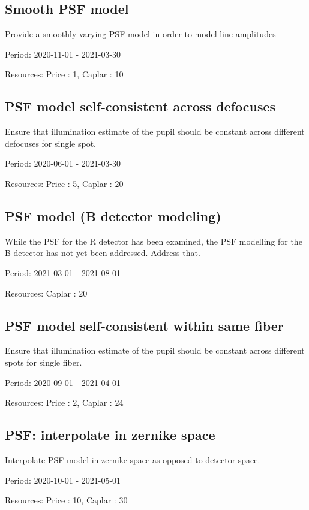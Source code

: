 \subsection{Smooth PSF model}

Provide a smoothly varying PSF model in order to model line amplitudes

Period: 2020-11-01 - 2021-03-30

Resources: Price : 1, Caplar : 10

\subsection{PSF model self-consistent across defocuses}

Ensure that illumination estimate of the pupil should be constant across different defocuses for single spot.

Period: 2020-06-01 - 2021-03-30

Resources: Price : 5, Caplar : 20

\subsection{PSF model (B detector modeling)}

While the PSF for the R detector has been examined, the PSF modelling for the B detector has not yet been addressed. Address that.

Period: 2021-03-01 - 2021-08-01

Resources: Caplar : 20

\subsection{PSF model self-consistent within same fiber}

Ensure that illumination estimate of the pupil should be constant across different spots for single fiber.

Period: 2020-09-01 - 2021-04-01

Resources: Price : 2, Caplar : 24

\subsection{PSF: interpolate in zernike space}

Interpolate PSF model in zernike space as opposed to detector space.

Period: 2020-10-01 - 2021-05-01

Resources: Price : 10, Caplar : 30

